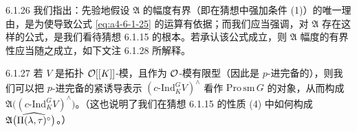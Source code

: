 \begin{rem}{6.1.26}\label{thm:a4-6-1-26}
我们指出：先验地假设 $\mathfrak{A}$ 的幅度有界（即在猜想中强加条件 (1)）的唯一理由，是为使导致公式 \eqref{eq:a4-6-1-25} 的运算有依据；而我们应当强调，对 $\mathfrak{A}$ 存在这样的公式，是我们看待猜想 6.1.15 的根本。若承认该公式成立，则 $\mathfrak{A}$ 幅度的有界性应当随之成立，如下文注 6.1.28 所解释。
\end{rem}

\begin{rem}{6.1.27}\label{thm:a4-6-1-27}
若 $V$ 是拓扑 $\mathcal{O}[[K]]$-模，且作为 $\mathcal{O}$-模有限型（因此是 $p$-进完备的），则我们可以把 $p$-进完备的紧诱导表示 $(c\text{-}\mathrm{Ind}_K^GV)^\wedge$ 看作 $\mathrm{Pro}\,\mathrm{sm}\,G$ 的对象，从而构成 $\mathfrak{A}\bigl((c\text{-}\mathrm{Ind}_K^GV)^\wedge\bigr)$。（这也说明了我们在猜想 6.1.15 的性质 (4) 中如何构成 $\mathfrak{A}\bigl(\widehat{\Pi(\lambda,\tau)^\circ}\bigr)$。）
\end{rem}
